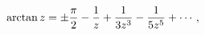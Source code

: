 \[\mathop{\mathrm{arctan}\/}\nolimits z=\pm\frac{\pi}{2}-\frac{1}{z}+\frac{1}{3z%
^{3}}-\frac{1}{5z^{5}}+\cdots,\]